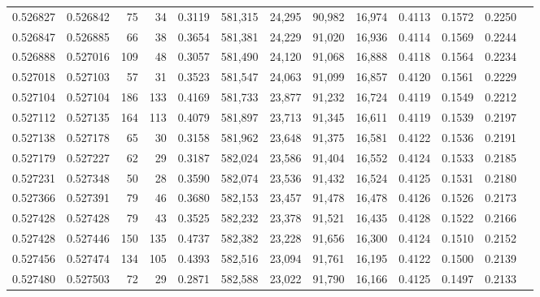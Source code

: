 \begin{tabular}{rrrrrrrrrrrrr}
0.526827 & 0.526842 &    75 &    34 &                                     0.3119 & 581,315 &  24,295 &  90,982 &  16,974 & 0.4113 & 0.1572 & 0.2250 \\
0.526847 & 0.526885 &    66 &    38 &                                     0.3654 & 581,381 &  24,229 &  91,020 &  16,936 & 0.4114 & 0.1569 & 0.2244 \\
0.526888 & 0.527016 &   109 &    48 &                                     0.3057 & 581,490 &  24,120 &  91,068 &  16,888 & 0.4118 & 0.1564 & 0.2234 \\
0.527018 & 0.527103 &    57 &    31 &                                     0.3523 & 581,547 &  24,063 &  91,099 &  16,857 & 0.4120 & 0.1561 & 0.2229 \\
0.527104 & 0.527104 &   186 &   133 &                                     0.4169 & 581,733 &  23,877 &  91,232 &  16,724 & 0.4119 & 0.1549 & 0.2212 \\
0.527112 & 0.527135 &   164 &   113 &                                     0.4079 & 581,897 &  23,713 &  91,345 &  16,611 & 0.4119 & 0.1539 & 0.2197 \\
0.527138 & 0.527178 &    65 &    30 &                                     0.3158 & 581,962 &  23,648 &  91,375 &  16,581 & 0.4122 & 0.1536 & 0.2191 \\
0.527179 & 0.527227 &    62 &    29 &                                     0.3187 & 582,024 &  23,586 &  91,404 &  16,552 & 0.4124 & 0.1533 & 0.2185 \\
0.527231 & 0.527348 &    50 &    28 &                                     0.3590 & 582,074 &  23,536 &  91,432 &  16,524 & 0.4125 & 0.1531 & 0.2180 \\
0.527366 & 0.527391 &    79 &    46 &                                     0.3680 & 582,153 &  23,457 &  91,478 &  16,478 & 0.4126 & 0.1526 & 0.2173 \\
0.527428 & 0.527428 &    79 &    43 &                                     0.3525 & 582,232 &  23,378 &  91,521 &  16,435 & 0.4128 & 0.1522 & 0.2166 \\
0.527428 & 0.527446 &   150 &   135 &                                     0.4737 & 582,382 &  23,228 &  91,656 &  16,300 & 0.4124 & 0.1510 & 0.2152 \\
0.527456 & 0.527474 &   134 &   105 &                                     0.4393 & 582,516 &  23,094 &  91,761 &  16,195 & 0.4122 & 0.1500 & 0.2139 \\
0.527480 & 0.527503 &    72 &    29 &                                     0.2871 & 582,588 &  23,022 &  91,790 &  16,166 & 0.4125 & 0.1497 & 0.2133 \\

\end{tabular}
